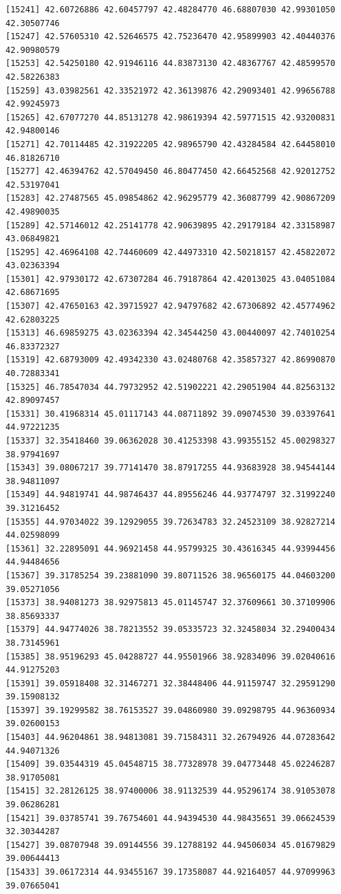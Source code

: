 \documentclass[
  letterpaper,
  DIV=11,
  numbers=noendperiod]{scrartcl}
\begin{document}
\begin{verbatim}
[15241] 42.60726886 42.60457797 42.48284770 46.68807030 42.99301050 42.30507746
[15247] 42.57605310 42.52646575 42.75236470 42.95899903 42.40440376 42.90980579
[15253] 42.54250180 42.91946116 44.83873130 42.48367767 42.48599570 42.58226383
[15259] 43.03982561 42.33521972 42.36139876 42.29093401 42.99656788 42.99245973
[15265] 42.67077270 44.85131278 42.98619394 42.59771515 42.93200831 42.94800146
[15271] 42.70114485 42.31922205 42.98965790 42.43284584 42.64458010 46.81826710
[15277] 42.46394762 42.57049450 46.80477450 42.66452568 42.92012752 42.53197041
[15283] 42.27487565 45.09854862 42.96295779 42.36087799 42.90867209 42.49890035
[15289] 42.57146012 42.25141778 42.90639895 42.29179184 42.33158987 43.06849821
[15295] 42.46964108 42.74460609 42.44973310 42.50218157 42.45822072 43.02363394
[15301] 42.97930172 42.67307284 46.79187864 42.42013025 43.04051084 42.68671695
[15307] 42.47650163 42.39715927 42.94797682 42.67306892 42.45774962 42.62803225
[15313] 46.69859275 43.02363394 42.34544250 43.00440097 42.74010254 46.83372327
[15319] 42.68793009 42.49342330 43.02480768 42.35857327 42.86990870 40.72883341
[15325] 46.78547034 44.79732952 42.51902221 42.29051904 44.82563132 42.89097457
[15331] 30.41968314 45.01117143 44.08711892 39.09074530 39.03397641 44.97221235
[15337] 32.35418460 39.06362028 30.41253398 43.99355152 45.00298327 38.97941697
[15343] 39.08067217 39.77141470 38.87917255 44.93683928 38.94544144 38.94811097
[15349] 44.94819741 44.98746437 44.89556246 44.93774797 32.31992240 39.31216452
[15355] 44.97034022 39.12929055 39.72634783 32.24523109 38.92827214 44.02598099
[15361] 32.22895091 44.96921458 44.95799325 30.43616345 44.93994456 44.94484656
[15367] 39.31785254 39.23881090 39.80711526 38.96560175 44.04603200 39.05271056
[15373] 38.94081273 38.92975813 45.01145747 32.37609661 30.37109906 38.85693337
[15379] 44.94774026 38.78213552 39.05335723 32.32458034 32.29400434 38.73145961
[15385] 38.95196293 45.04288727 44.95501966 38.92834096 39.02040616 44.91275203
[15391] 39.05918408 32.31467271 32.38448406 44.91159747 32.29591290 39.15908132
[15397] 39.19299582 38.76153527 39.04860980 39.09298795 44.96360934 39.02600153
[15403] 44.96204861 38.94813081 39.71584311 32.26794926 44.07283642 44.94071326
[15409] 39.03544319 45.04548715 38.77328978 39.04773448 45.02246287 38.91705081
[15415] 32.28126125 38.97400006 38.91132539 44.95296174 38.91053078 39.06286281
[15421] 39.03785741 39.76754601 44.94394530 44.98435651 39.06624539 32.30344287
[15427] 39.08707948 39.09144556 39.12788192 44.94506034 45.01679829 39.00644413
[15433] 39.06172314 44.93455167 39.17358087 44.92164057 44.97099963 39.07665041

\end{verbatim}
\end{document}
